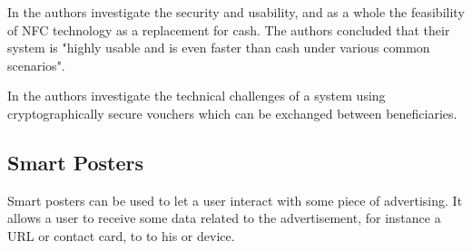 
In \cite{1555846} the authors investigate the security and usability, and as a whole the feasibility of NFC technology as a replacement for cash.
The authors concluded that their system is "highly usable and is even faster than cash under various common scenarios".

In \cite{1592613} the authors investigate the technical challenges of a system using cryptographically secure vouchers which can be exchanged between beneficiaries.

\subsection{Smart Posters}
Smart posters can be used to let a user interact with some piece of advertising.
It allows a user to receive some data related to the advertisement, for instance a URL or contact card, to to his or device.





